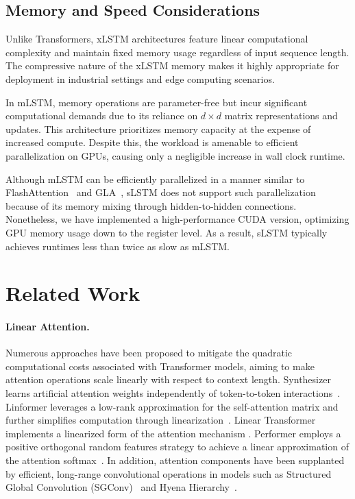 \subsection{Memory and Speed Considerations}

Unlike Transformers, xLSTM architectures feature linear computational complexity and maintain fixed memory usage regardless of input sequence length. The compressive nature of the xLSTM memory makes it highly appropriate for deployment in industrial settings and edge computing scenarios.

In mLSTM, memory operations are parameter-free but incur significant computational demands due to its reliance on $d \times d$ matrix representations and updates. This architecture prioritizes memory capacity at the expense of increased compute. Despite this, the workload is amenable to efficient parallelization on GPUs, causing only a negligible increase in wall clock runtime.

Although mLSTM can be efficiently parallelized in a manner similar to FlashAttention~\citep{Dao:22,Dao:23} and GLA~\citep{Yang:23arxiv}, sLSTM does not support such parallelization because of its memory mixing through hidden-to-hidden connections. Nonetheless, we have implemented a high-performance CUDA version, optimizing GPU memory usage down to the register level. As a result, sLSTM typically achieves runtimes less than twice as slow as mLSTM.

\section{Related Work}
\label{sec:related}

\paragraph{Linear Attention.} Numerous approaches have been proposed to mitigate the quadratic computational costs associated with Transformer models, aiming to make attention operations scale linearly with respect to context length. Synthesizer learns artificial attention weights independently of token-to-token interactions~\citep{Tay:20arxiv}. Linformer leverages a low-rank approximation for the self-attention matrix and further simplifies computation through linearization~\citep{Wang:20arxiv}. Linear Transformer implements a linearized form of the attention mechanism \citep{Katharopoulos:20}. Performer employs a positive orthogonal random features strategy to achieve a linear approximation of the attention softmax~\citep{Choromanski:21}. In addition, attention components have been supplanted by efficient, long-range convolutional operations in models such as Structured Global Convolution (SGConv)~\citep{Li:22} and Hyena Hierarchy~\citep{Poli:23}.

